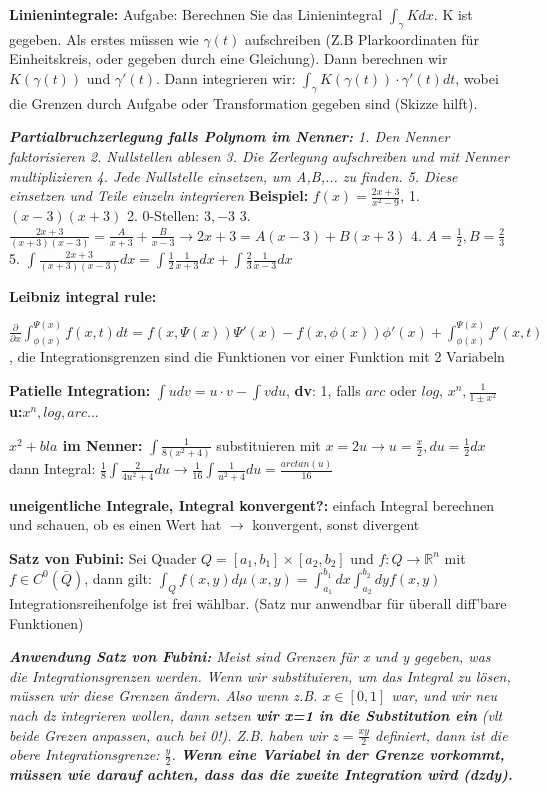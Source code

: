 \documentclass[a3paper, ngerman, 8pt]{article}
\begin{document}
\begin{multicols*}{3}
\textbf{Linienintegrale:} Aufgabe: Berechnen Sie das Linienintegral $\int_{\gamma} Kdx$. K ist gegeben. Als erstes müssen wie $\gamma (t)$ aufschreiben (Z.B Plarkoordinaten für Einheitskreis, oder gegeben durch eine Gleichung). Dann berechnen wir $K(\gamma (t))$ und $\gamma ' (t)$. Dann integrieren wir: $\int_{\gamma} K(\gamma (t))\cdot \gamma ' (t)dt$, wobei die Grenzen durch Aufgabe oder Transformation gegeben sind (Skizze hilft).

\textit{\textbf{Partialbruchzerlegung falls Polynom im Nenner:} 1. Den Nenner faktorisieren 2. Nullstellen ablesen 3. Die Zerlegung aufschreiben und mit Nenner multiplizieren 4. Jede Nullstelle einsetzen, um A,B,... zu finden. 5. Diese einsetzen und Teile einzeln integrieren}
\textbf{Beispiel: }$f(x)=\frac{2x+3}{x^2-9}$, 1. $(x-3)(x+3)$ 2. 0-Stellen: $3, -3$ 3. $\frac{2x+3}{(x+3)(x-3)}=\frac{A}{x+3}+ \frac{B}{x-3} \to 2x+3=A(x-3)+B(x+3)$ 4. $A=\frac{1}{2}, B=\frac{2}{3}$ 5. $\int\frac{2x+3}{(x+3)(x-3)}dx=\int\frac{1}{2}\frac{1}{x+3}dx+ \int\frac{2}{3}\frac{1}{x-3}dx$

\textbf{Leibniz integral rule:} 

$\frac{\partial}{\partial x}\int_{\phi (x)}^{\Psi (x)}f(x,t)dt= f(x, \Psi(x))\Psi'(x)-f(x, \phi (x))\phi'(x)+\int_{\phi (x)}^{\Psi(x)}f'(x, t)$, die Integrationsgrenzen sind die Funktionen vor einer Funktion mit 2 Variabeln

\textbf{Patielle Integration:} $\int u dv=u\cdot v -\int v du$, \textbf{dv}: 1, falls $arc$ oder $log$, $x^n, \frac{1}{1\pm x^2}$
\textbf{u:}$x^n, log, arc... $

\textbf{$x^2 + bla$ im Nenner:} $\int \frac{1}{8(x^2+4)}$ substituieren mit $x=2u \to u=\frac{x}{2}, du = \frac{1}{2}dx$ dann Integral: $\frac{1}{8}\int \frac{2}{4u^2+4}du \to \frac{1}{16} \int \frac{1}{u^2+4}du= \frac{arctan(u)}{16}$

\textbf{uneigentliche Integrale, Integral konvergent?:} einfach Integral berechnen und schauen, ob es einen Wert hat $\to$ konvergent, sonst divergent

\textbf{Satz von Fubini:} Sei Quader $Q=[a_1, b_1]\times[a_2, b_2]$ und $f: Q \to \mathbb{R}^n$ mit $f \in C^0(\bar{Q})$, dann gilt: $\int_Q f(x,y)d\mu (x, y)= \int_{a_1}^{b_1}dx\int_{a_2}^{b_2}dy f(x,y)$ Integrationsreihenfolge ist frei wählbar. (Satz nur anwendbar für überall diff'bare Funktionen)

\textit{\textbf{Anwendung Satz von Fubini:} Meist sind Grenzen für x und y gegeben, was die Integrationsgrenzen werden. Wenn wir substituieren, um das Integral zu lösen, müssen wir diese Grenzen ändern. Also wenn z.B. $x\in [0,1]$ war, und wir neu nach dz integrieren wollen, dann setzen \textbf{wir x=1 in die Substitution ein} (vlt beide Grezen anpassen, auch bei 0!). Z.B. haben wir $z=\frac{xy}{2}$ definiert, dann ist die obere Integrationsgrenze: $\frac{y}{2}$. \textbf{Wenn eine Variabel in der Grenze vorkommt, müssen wie darauf achten, dass das die zweite Integration wird (dzdy). }}


\end{multicols*}
\end{document}
